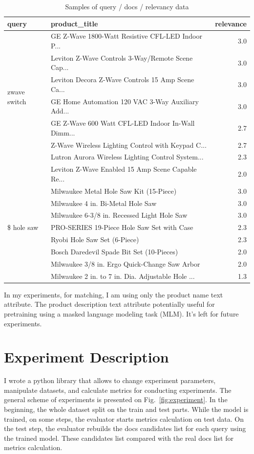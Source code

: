 \documentclass{article}
\begin{document}
\begin{table}[tbh!]
\centering
\caption{Samples of query / docs / relevancy data}
\begin{tabular}{llr}
\toprule
  query &                                      product\_title &  relevance \\
\midrule
 \multirow{7}{*}{zwave switch} &  GE Z-Wave 1800-Watt Resistive CFL-LED Indoor P... &        3.0 \\
 &  Leviton Z-Wave Controls 3-Way/Remote Scene Cap... &        3.0 \\
 &  Leviton Decora Z-Wave Controls 15 Amp Scene Ca... &        3.0 \\
 &  GE Home Automation 120 VAC 3-Way Auxiliary Add... &        3.0 \\
 &  GE Z-Wave 600 Watt CFL-LED Indoor In-Wall Dimm... &        2.7 \\
 &  Z-Wave Wireless Lighting Control with Keypad C... &        2.7 \\
 &  Lutron Aurora Wireless Lighting Control System... &        2.3 \\
 &  Leviton Z-Wave Enabled 15 Amp Scene Capable Re... &        2.0 \\
 \hline
 \multirow{7}{*}{\$ hole saw} &            Milwaukee Metal Hole Saw Kit (15-Piece) &        3.0 \\
 &                  Milwaukee 4 in. Bi-Metal Hole Saw &        3.0 \\
 &        Milwaukee 6-3/8 in. Recessed Light Hole Saw &        3.0 \\
 &         PRO-SERIES 19-Piece Hole Saw Set with Case &        2.3 \\
 &                       Ryobi Hole Saw Set (6-Piece) &        2.3 \\
 &          Bosch Daredevil Spade Bit Set (10-Pieces) &        2.0 \\
 &      Milwaukee 3/8 in. Ergo Quick-Change Saw Arbor &        2.0 \\
 &  Milwaukee 2 in. to 7 in. Dia. Adjustable Hole ... &        1.3 \\
\bottomrule
\end{tabular}
\end{table}

	In my experiments, for matching, I am using only the product name text attribute. The product description text attribute potentially useful for pretraining using a masked language modeling task (MLM). It's left for future experiments.

\section{Experiment Description}
I wrote a python library that allows to change experiment parameters, manipulate datasets, and calculate metrics for conducting experiments. The general scheme of experiments is presented on Fig.~\ref{fig:experiment}. 
In the beginning, the whole dataset split on the train and test parts. While the model is trained, on some steps, the evaluator starts metrics calculation on test data. 
On the test step, the evaluator rebuilds the docs candidates list for each query using the trained model. These candidates list compared with the real docs list for metrics calculation. 
\end{document}
